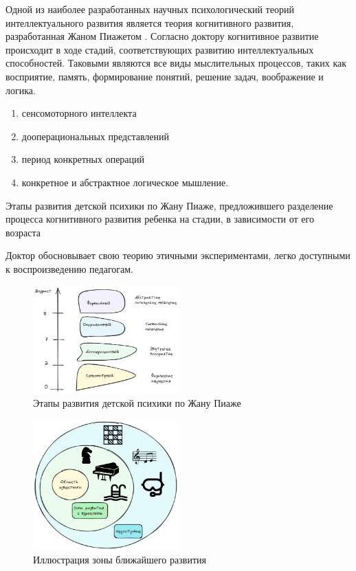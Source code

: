 Одной из наиболее разработанных научных психологический теорий интеллектуального развития 
является теория когнитивного развития, разработанная Жаном Пиажетом \cite{piaget1952origins}.
Согласно доктору когнитивное развитие происходит в ходе стадий, соответствующих развитию интеллектуальных
способностей. Таковыми являются все виды мыслительных процессов, таких как восприятие,
память, формирование понятий, решение задач, воображение и логика.

\begin{enumerate}
    \item сенсомоторного интеллекта
    \item дооперациональных представлений
    \item период конкретных операций
    \item конкретное и абстрактное логическое мышление. 
\end{enumerate}

Этапы развития детской психики по Жану Пиаже, предложившего
разделение процесса когнитивного развития ребенка на стадии, в зависимости от его возраста

Доктор обосновывает свою теорию этичными экспериментами, легко доступными к воспроизведению педагогам.


\begin{figure}[h]
    \centering
    \includegraphics[width=0.5\textwidth]{assets/pedagogic/psy/piage.excalidraw.png}
    \caption{Этапы развития детской психики по Жану Пиаже \cite{piaget1952origins}}
    \label{piage}
\end{figure}


\begin{figure}[h]
    \centering
    \includegraphics[width=0.5\textwidth]{assets/pedagogic/psy/proximal_growth.excalidraw.png}
    \caption{Иллюстрация зоны ближайшего развития}
    \label{proximal_growth}
\end{figure}


